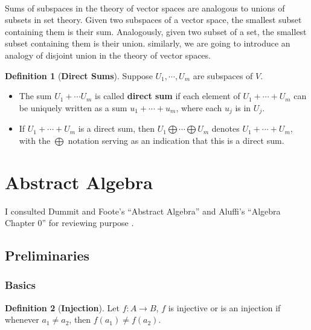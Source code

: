 \documentclass[paper=a4, fontsize=11pt]{scrartcl}
\numberwithin{equation}{section}		%
\numberwithin{figure}{section}			%
\numberwithin{table}{section}				%
\renewcommand{\to}{\ensuremath{\rightarrow}}
\theoremstyle{definition}
\newtheorem{definition}{Definition}[section]
\theoremstyle{remark}
\theoremstyle{example}
\begin{document}
\paragraph{}

Sums of subspaces in the theory of vector spaces are analogous to unions of subsets in set theory. Given two subspaces of a vector space, the smallest subset containing them is their sum. Analogously, given two subset of a set, the smallest subset containing them is their union. similarly, we are going to introduce an analogy of disjoint union in the theory of vector spaces.

\begin{definition}[\textbf{Direct Sums}]
    Suppose $U_1,\cdots,U_m$ are subspaces of $V$.
    \begin{itemize}
        \item The sum $U_1+\cdots U_m$ is called \textbf{direct sum} if each element of $U_1+\cdots+U_m$ can be uniquely written as a sum $u_1+\cdots+u_m$, where each $u_j$ is in $U_j$.
        \item If $U_1+\cdots+U_m$ is a direct sum, then $U_1\bigoplus\cdots\bigoplus U_m$ denotes $U_1+\cdots+U_m$, with the $\bigoplus$ notation serving as an indication that this is a direct sum.
    \end{itemize}
\end{definition}

\newpage
\section{Abstract Algebra}

I consulted Dummit and Foote's ``Abstract Algebra'' \cite{foote_abstract_2003} and Aluffi's ``Algebra Chapter 0''\cite{aluffi_algebra_2009} for reviewing purpose .

\subsection{Preliminaries}

\subsubsection{Basics}

\begin{definition}[\textbf{Injection}]
    Let $f: A \to B$, $f$ is injective or is an injection if whenever $a_1 \neq a_2$, then $f(a_1)\neq f(a_2)$.
\end{definition}
\end{document}

